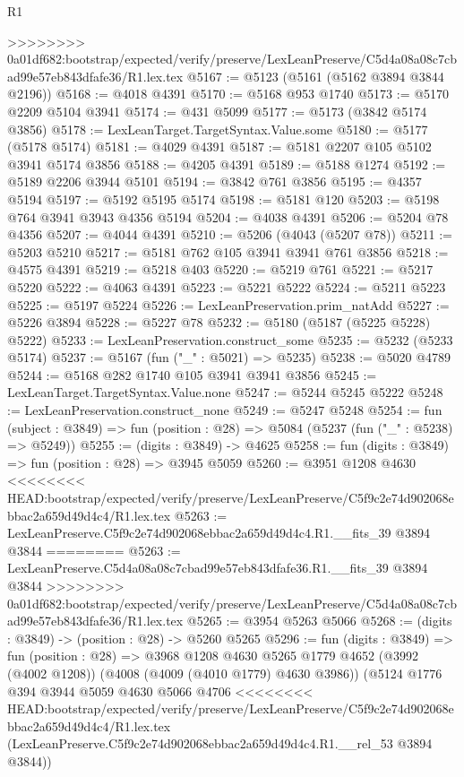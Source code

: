 \begin{lexlean}{R1}
\begin{coremodule}
{{{{{{{{{{{{{{{{{{{{{{{{{{{{{{{{{{{{{{{{{{{{{{{{{{{{{{{{{{{{{{{{{{{{{{{{{{{{{{{{{{{{{{{{{{{{{{{{{{{{{{{{{{{{{{{{{{{{{{{{{{{{{{{{{{{{{{{{{{{{{{{{{{{{{{{{{{{{{{{{{{{{{{{{{{{{{{{{{{{{{{{{{{>>>>>>>> 0a01df682:bootstrap/expected/verify/preserve/LexLeanPreserve/C5d4a08a08c7cbad99e57eb843dfafe36/R1.lex.tex
@5167 := @5123 (@5161 (@5162 @3894 @3844 @2196))
@5168 := @4018 @4391
@5170 := @5168 @953 @1740
@5173 := @5170 @2209 @5104 @3941
@5174 := @431 @5099
@5177 := @5173 (@3842 @5174 @3856)
@5178 := LexLeanTarget.TargetSyntax.Value.some
@5180 := @5177 (@5178 @5174)
@5181 := @4029 @4391
@5187 := @5181 @2207 @105 @5102 @3941 @5174 @3856
@5188 := @4205 @4391
@5189 := @5188 @1274
@5192 := @5189 @2206 @3944 @5101
@5194 := @3842 @761 @3856
@5195 := @4357 @5194
@5197 := @5192 @5195 @5174
@5198 := @5181 @120
@5203 := @5198 @764 @3941 @3943 @4356 @5194
@5204 := @4038 @4391
@5206 := @5204 @78 @4356
@5207 := @4044 @4391
@5210 := @5206 (@4043 (@5207 @78))
@5211 := @5203 @5210
@5217 := @5181 @762 @105 @3941 @3941 @761 @3856
@5218 := @4575 @4391
@5219 := @5218 @403
@5220 := @5219 @761
@5221 := @5217 @5220
@5222 := @4063 @4391
@5223 := @5221 @5222
@5224 := @5211 @5223
@5225 := @5197 @5224
@5226 := LexLeanPreservation.prim_natAdd
@5227 := @5226 @3894
@5228 := @5227 @78
@5232 := @5180 (@5187 (@5225 @5228) @5222)
@5233 := LexLeanPreservation.construct_some
@5235 := @5232 (@5233 @5174)
@5237 := @5167 (fun ("_" : @5021) => @5235)
@5238 := @5020 @4789
@5244 := @5168 @282 @1740 @105 @3941 @3941 @3856
@5245 := LexLeanTarget.TargetSyntax.Value.none
@5247 := @5244 @5245 @5222
@5248 := LexLeanPreservation.construct_none
@5249 := @5247 @5248
@5254 := fun (subject : @3849) => fun (position : @28) => @5084 (@5237 (fun ("_" : @5238) => @5249))
@5255 := (digits : @3849) -> @4625
@5258 := fun (digits : @3849) => fun (position : @28) => @3945 @5059
@5260 := @3951 @1208 @4630
<<<<<<<< HEAD:bootstrap/expected/verify/preserve/LexLeanPreserve/C5f9c2e74d902068ebbac2a659d49d4c4/R1.lex.tex
@5263 := LexLeanPreserve.C5f9c2e74d902068ebbac2a659d49d4c4.R1.__fits_39 @3894 @3844
========
@5263 := LexLeanPreserve.C5d4a08a08c7cbad99e57eb843dfafe36.R1.__fits_39 @3894 @3844
>>>>>>>> 0a01df682:bootstrap/expected/verify/preserve/LexLeanPreserve/C5d4a08a08c7cbad99e57eb843dfafe36/R1.lex.tex
@5265 := @3954 @5263 @5066
@5268 := (digits : @3849) -> (position : @28) -> @5260 @5265
@5296 := fun (digits : @3849) =>
  fun (position : @28) =>
  @3968
    @1208
    @4630
    @5265
    @1779
    @4652
    (@3992 (@4002 @1208))
    (@4008 (@4009 (@4010 @1779) @4630 @3986))
    (@5124
      @1776
      @394
      @3944
      @5059
      @4630
      @5066
      @4706
<<<<<<<< HEAD:bootstrap/expected/verify/preserve/LexLeanPreserve/C5f9c2e74d902068ebbac2a659d49d4c4/R1.lex.tex
      (LexLeanPreserve.C5f9c2e74d902068ebbac2a659d49d4c4.R1.__rel_53 @3894 @3844))
}}}}}}}}}}}}}}}}}}}}}}}}}}}}}}}}}}}}}}}}}}}}}}}}}}}}}}}}}}}}}}}}}}}}}}}}}}}}}}}}}}}}}}}}}}}}}}}}}}}}}}}}}}}}}}}}}}}}}}}}}}}}}}}}}}}}}}}}}}}}}}}}}}}}}}}}}}}}}}}}}}}}}}}}}}}}}}}}}}}}}}}}}}
\end{coremodule}
\end{lexlean}
